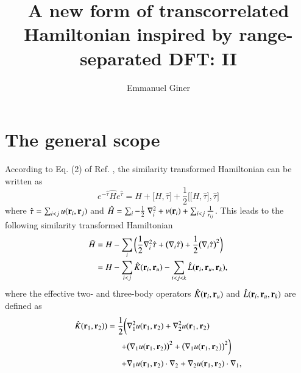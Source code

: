 \documentclass[aip,jcp,reprint,noshowkeys,superscriptaddress]{revtex4-1}
\newcommand{\br}[0]{{\bf {r}}}
\newcommand{\bri}[1]{{\bf r}_{#1}}
\begin{document}
	

\title{A new form of transcorrelated Hamiltonian inspired by range-separated DFT: II }

\author{Emmanuel Giner}

\begin{abstract}

\end{abstract}

\maketitle

\section{The general scope}
According to Eq. (2) of Ref. , the similarity transformed Hamiltonian can be written as 
\begin{equation}
 \label{ht_def_g}
 e^{-\hat{\tau}} \hat{H} e^{\hat{\tau}} = H + \big[ H,\hat{\tau} \big] + \frac{1}{2}\bigg[ \big[H,\hat{\tau}\big],\hat{\tau}\bigg]
\end{equation}
where $\hat{\tau} = \sum_{i<j}u(\br{}_i,\br{}_j)$ and $\hat{H} = \sum_i -\frac{1}{2} \nabla^2_i + v(\br{}_i) + \sum_{i<j} \frac{1}{r_{ij}}$. 
This leads to the following similarity transformed Hamiltonian 
\begin{equation}
 \begin{aligned}
 \label{ht_def_gu}
 \tilde{H} & = H - \sum_i \bigg( \frac{1}{2} \nabla_i^2 \hat{\tau} + \big(\nabla_i \hat{\tau} \big) + \frac{1}{2} \big(\nabla_i \hat{\tau} \big)^2  \bigg) \\
           & = H - \sum_{i<j} \hat{K}(\bri{i},\bri{u}) - \sum_{i<j<k} \hat{L}(\bri{i},\bri{u},\bri{k}),
 \end{aligned}
\end{equation}
where the effective two- and three-body operators $\hat{K}(\bri{i},\bri{u})$ and $\hat{L}(\bri{i},\bri{u},\bri{k})$ are defined as
\begin{equation}
 \begin{aligned}
 \label{def_k}
  \hat{K}(\bri{1},\bri{2}) ) = \frac{1}{2} \bigg( &\nabla_1^2 u(\bri{1},\bri{2}) + \nabla_2^2u(\bri{1},\bri{2}) \\
                                               + &\big(\nabla_1 u(\bri{1},\bri{2}) \big) ^2 + \big(\nabla_1 u(\bri{1},\bri{2}) \big) ^2 \bigg) \\
                                               + &\nabla_1 u(\bri{1},\bri{2}) \cdot \nabla_2 + \nabla_2 u(\bri{1},\bri{2}) \cdot \nabla_1,
 \end{aligned}
\end{equation}
\end{document}
